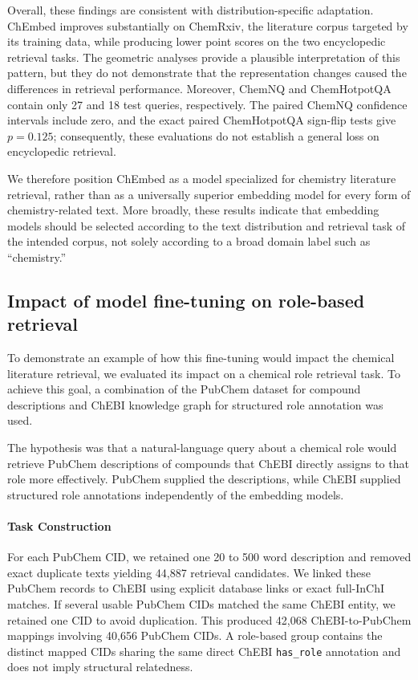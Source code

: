 \documentclass[twoside,twocolumn,9pt]{article}
\begin{document}
Overall, these findings are consistent with distribution-specific adaptation. ChEmbed improves substantially on ChemRxiv, the literature corpus targeted by its training data, while producing lower point scores on the two encyclopedic retrieval tasks. The geometric analyses provide a plausible interpretation of this pattern, but they do not demonstrate that the representation changes caused the differences in retrieval performance. Moreover, ChemNQ and ChemHotpotQA contain only 27 and 18 test queries, respectively. The paired ChemNQ confidence intervals include zero, and the exact paired ChemHotpotQA sign-flip tests give $p=0.125$; consequently, these evaluations do not establish a general loss on encyclopedic retrieval.

We therefore position ChEmbed as a model specialized for chemistry literature retrieval, rather than as a universally superior embedding model for every form of chemistry-related text. More broadly, these results indicate that embedding models should be selected according to the text distribution and retrieval task of the intended corpus, not solely according to a broad domain label such as ``chemistry.''

\subsection{Impact of model fine-tuning on role-based retrieval}
\label{subsec:chebi-role-retrieval}
To demonstrate an example of how this fine-tuning would impact the chemical literature retrieval, we evaluated its impact on a chemical role retrieval task.
To achieve this goal, a combination of the PubChem dataset \cite{kim2019pubchem} for compound descriptions and ChEBI \citep{malik2025chebi} knowledge graph for structured role annotation was used.

The hypothesis was that a natural-language query about a chemical role would retrieve PubChem descriptions of compounds that ChEBI directly assigns to that role more effectively. PubChem supplied the descriptions, while ChEBI supplied structured role annotations independently of the embedding models.

\paragraph*{Task Construction}
For each PubChem CID, we retained one 20 to 500 word description and removed exact duplicate texts yielding 44,887 retrieval candidates. We linked these PubChem records to ChEBI using explicit database links or exact full-InChI matches. If several usable PubChem CIDs matched the same ChEBI entity, we retained one CID to avoid duplication. This produced 42,068 ChEBI-to-PubChem mappings involving 40,656 PubChem CIDs. A role-based group contains the distinct mapped CIDs sharing the same direct ChEBI \texttt{has\_role} annotation and does not imply structural relatedness.
\end{document}

